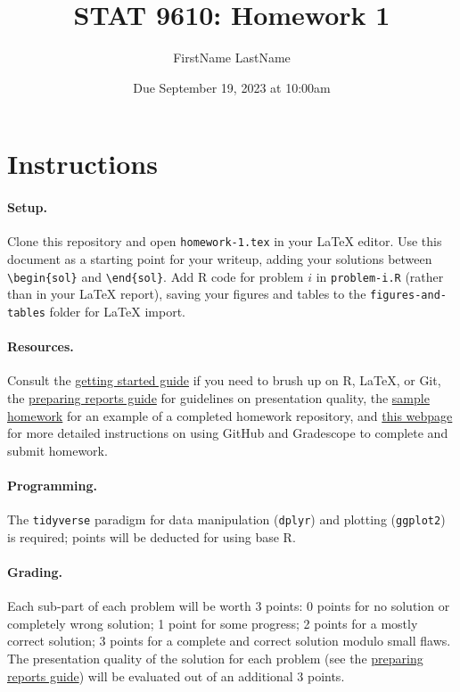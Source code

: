 \documentclass[11pt,letterpaper,english,oneside]{article} %
\author{FirstName LastName}
\title{STAT 9610: Homework 1}
\date{Due September 19, 2023 at 10:00am}
\theoremstyle{definition} %
\newtheorem{solution}{Solution}
\newenvironment{sol}{\begin{solution}\hspace{0pt}}{\end{solution}}
\begin{document}
\maketitle

\section{Instructions}

\paragraph{Setup.} Clone this repository and open \verb|homework-1.tex| in your LaTeX editor. Use this document as a starting point for your writeup, adding your solutions between \verb|\begin{sol}| and \verb|\end{sol}|. Add R code for problem $i$ in \verb|problem-i.R| (rather than in your LaTeX report), saving your figures and tables to the \verb|figures-and-tables| folder for LaTeX import. 

\paragraph{Resources.}

Consult the \href{https://katsevich-teaching.github.io/stat-9610-fall-2023/assets/getting-started.pdf}{getting started guide} if you need to brush up on R, LaTeX, or Git, the \href{https://katsevich-teaching.github.io/stat-9610-fall-2023/assets/preparing-reports.pdf}{preparing reports guide} for guidelines on presentation quality, the \href{https://github.com/stat-9610-fall-2023/sample-homework-stat-9610}{sample homework} for an example of a completed homework repository, and \href{https://hmc-cs-131-spring2020.github.io/howtos/assignments.html}{this webpage} for more detailed instructions on using GitHub and Gradescope to complete and submit homework.

\paragraph{Programming.}

The \verb|tidyverse| paradigm for data manipulation (\verb|dplyr|) and plotting (\verb|ggplot2|) is required; points will be deducted for using base R. 

\paragraph{Grading.} Each sub-part of each problem will be worth 3 points: 0 points for no solution or completely wrong solution; 1 point for some progress; 2 points for a mostly correct solution; 3 points for a complete and correct solution modulo small flaws. The presentation quality of the solution for each problem (see the \href{https://katsevich-teaching.github.io/stat-9610-fall-2023/assets/preparing-reports.pdf}{preparing reports guide}) will be evaluated out of an additional 3 points.
\end{document}
